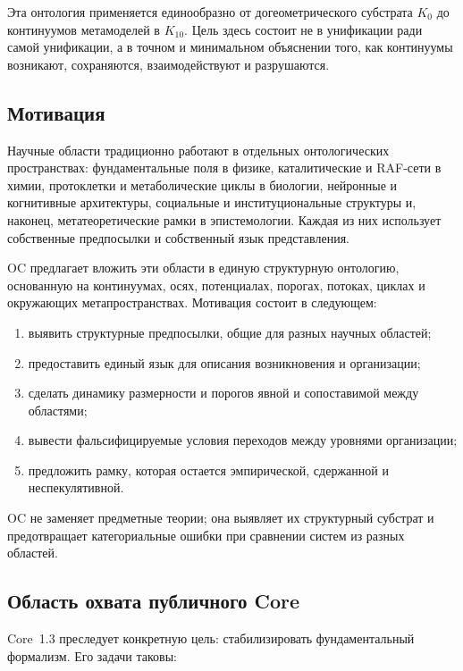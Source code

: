 Эта онтология применяется единообразно от догеометрического субстрата \(K_0\) до континуумов метамоделей в \(K_{10}\). Цель здесь состоит не в унификации ради самой унификации, а в точном и минимальном объяснении того, как континуумы возникают, сохраняются, взаимодействуют и разрушаются.

\subsection{Мотивация}

Научные области традиционно работают в отдельных онтологических пространствах: фундаментальные поля в физике, каталитические и RAF-сети в химии, протоклетки и метаболические циклы в биологии, нейронные и когнитивные архитектуры, социальные и институциональные структуры и, наконец, метатеоретические рамки в эпистемологии. Каждая из них использует собственные предпосылки и собственный язык представления.

OC предлагает вложить эти области в единую структурную онтологию, основанную на континуумах, осях, потенциалах, порогах, потоках, циклах и окружающих метапространствах. Мотивация состоит в следующем:

\begin{enumerate}
    \item выявить структурные предпосылки, общие для разных научных областей;
    \item предоставить единый язык для описания возникновения и организации;
    \item сделать динамику размерности и порогов явной и сопоставимой между областями;
    \item вывести фальсифицируемые условия переходов между уровнями организации;
    \item предложить рамку, которая остается эмпирической, сдержанной и неспекулятивной.
\end{enumerate}

OC не заменяет предметные теории; она выявляет их структурный субстрат и предотвращает категориальные ошибки при сравнении систем из разных областей.

\subsection{Область охвата публичного Core}

Core~1.3 преследует конкретную цель: стабилизировать фундаментальный формализм. Его задачи таковы:

